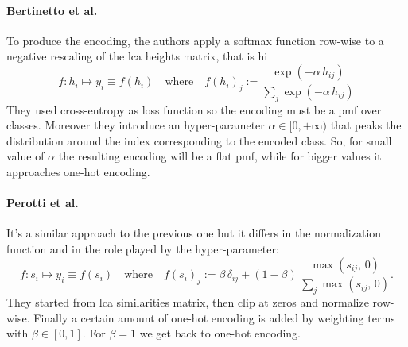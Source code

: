 \paragraph{Bertinetto et al.~\cite{MakingBetterMBertin2019}}\label{par:encoding-mbm}
To produce the encoding, the authors apply a softmax function row-wise to a
negative rescaling of the lca heights matrix, that is hi
\begin{equation}
  f : h_i \mapsto y_i \equiv f(h_i)
  \quad \textrm{where} \quad
  f (h_i)_j := \frac{\exp \left({-\alpha \, h_{ij}}\right)}
  {\sum_j \exp\left({-\alpha \, h_{ij}}\right)}
  \label{eq:mbm-hierarchical-encoding}
\end{equation}
They used cross-entropy as loss function so the encoding must be a
\acrshort{pmf} over classes. Moreover they introduce an hyper-parameter $\alpha
\in [0, +\infty)$ that peaks the distribution around the index corresponding to
the encoded class. So, for small value of $\alpha$ the resulting encoding will
be a flat \acrshort{pmf}, while for bigger values it approaches one-hot
encoding.

\paragraph{Perotti et al.~\cite{BeyondOneHotPerott2023}}\label{par:encoding-b3p}
It's a similar
approach to the previous one but it differs in the normalization function and
in the role played by the hyper-parameter:
\begin{equation}
  f :  s_i \mapsto y_i \equiv f(s_i)
  \quad \textrm{where} \quad
  f (s_i)_j := \beta \, \delta_{ij} +
  \left(1 - \beta \right) \, \frac{\max \left(s_{ij},\,0\right)}
  {\sum_j \max \left(s_{ij},\,0\right)}.
  \label{eq:b3p-hierarchical-encoding}
\end{equation}
They started from \acrshort{lca} similarities matrix, then clip at zeros and
normalize row-wise. Finally a certain amount of one-hot encoding is added by
weighting terms with $\beta \in [0, 1]$. For $\beta = 1$ we get back to one-hot
encoding.

